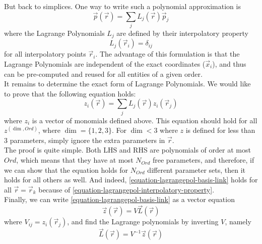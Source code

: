 \noindent
But back to simplices. One way to write such a polynomial approximation is
\begin{equation}
	\vec{p}(\vec{r}) = \sum_j L_j(\vec{r})\vec{p}_j 
\end{equation}
\noindent
where the Lagrange Polynomials $L_j$ are defined by their interpolatory property
\begin{equation}
	\label{equation-lagrangepol-interpolatory-property}
	L_j(\vec{r}_i) = \delta_{ij}
\end{equation}
\noindent
for all interpolatory points $\vec{r}_i$. The advantage of this formulation is that the Lagrange Polynomials are independent of the exact coordinates ($\vec{x}_i$), and thus can be pre-computed and reused for all entities of a given order. \\

\noindent
It remains to determine the exact form of Lagrange Polynomials. We would like to prove that the following equation holds:
\begin{equation}
	\label{equation-lagrangepol-basis-link}
	z_i(\vec{r}) = \sum_j L_j(\vec{r}) z_i (\vec{r}_j) 
\end{equation}
\noindent
where $z_i$ is a vector of monomials defined above. This equation should hold for all $z^{(\dim, Ord)}$, where $\dim = \{1,2,3\}$. For $\dim < 3$ where $z$ is defined for less than 3 parameters, simply ignore the extra parameters in $\vec{r}$. \\

\noindent
The proof is quite simple. Both LHS and RHS are polynomials of order at most $Ord$, which means that they have at most $N_{Ord}$ free parameters, and therefore, if we can show that the equation holds for $N_{Ord}$ different parameter sets, then it holds for all others as well. And indeed, \eqref{equation-lagrangepol-basis-link} holds for all $\vec{r} = \vec{r}_k$ because of \eqref{equation-lagrangepol-interpolatory-property}. \\

\noindent
Finally, we can write \eqref{equation-lagrangepol-basis-link} as a vector equation
\begin{equation}
	\vec{z} (\vec{r}) = V \vec{L} (\vec{r})
\end{equation}
\noindent
where $V_{ij} = z_i (\vec{r}_j)$, and find the Lagrange polynomials by inverting $V$, namely
\begin{equation}
	\vec{L} (\vec{r}) = V^{-1} \vec{z} (\vec{r})
\end{equation}


